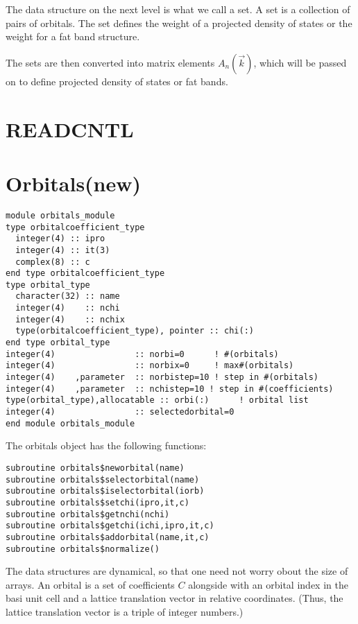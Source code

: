 \documentclass[11pt,a4paper]{report}
\begin{document}
The data structure on the next level is what we call a set. A set is a
collection of pairs of orbitals. The set defines the weight of a
projected density of states or the weight for a fat band structure.

The sets are then converted into matrix elements $A_{n}(\vec{k})$,
which will be passed on to define projected density of states or fat
bands.


\section{READCNTL}

\section{Orbitals(new)}
\begin{verbatim}
module orbitals_module
type orbitalcoefficient_type
  integer(4) :: ipro
  integer(4) :: it(3)
  complex(8) :: c
end type orbitalcoefficient_type
type orbital_type
  character(32) :: name
  integer(4)    :: nchi
  integer(4)    :: nchix
  type(orbitalcoefficient_type), pointer :: chi(:)
end type orbital_type
integer(4)                :: norbi=0      ! #(orbitals)
integer(4)                :: norbix=0     ! max#(orbitals)
integer(4)    ,parameter  :: norbistep=10 ! step in #(orbitals)
integer(4)    ,parameter  :: nchistep=10 ! step in #(coefficients)
type(orbital_type),allocatable :: orbi(:)      ! orbital list
integer(4)                :: selectedorbital=0
end module orbitals_module
\end{verbatim}


The orbitals object has the following functions:
\begin{verbatim}
subroutine orbitals$neworbital(name)
subroutine orbitals$selectorbital(name)
subroutine orbitals$iselectorbital(iorb)
subroutine orbitals$setchi(ipro,it,c)
subroutine orbitals$getnchi(nchi)
subroutine orbitals$getchi(ichi,ipro,it,c)
subroutine orbitals$addorbital(name,it,c)
subroutine orbitals$normalize()
\end{verbatim}
The data structures are dynamical, so that one need not worry obout
the size of arrays. An orbital is a set of coefficients $C$ alongside
with an orbital index in the basi unit cell and a lattice translation
vector in relative coordinates. (Thus, the lattice translation vector
is a triple of integer numbers.)
\end{document}
